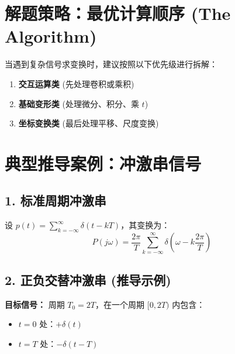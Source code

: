 \section*{ 解题策略：最优计算顺序 (The Algorithm)}
\begin{tcolorbox}[colback=green!5!white, colframe=green!50!black]
当遇到复杂信号求变换时，建议按照以下优先级进行拆解：
\begin{enumerate}
    \item \textbf{交互运算类} (先处理卷积或乘积)
    \item \textbf{基础变形类} (处理微分、积分、乘 $t$)
    \item \textbf{坐标变换类} (最后处理平移、尺度变换)
\end{enumerate}
\end{tcolorbox}

\section{典型推导案例：冲激串信号}

\subsection{1. 标准周期冲激串}
设 $p(t) = \sum_{k=-\infty}^{\infty} \delta(t - kT)$，其变换为：
\[ P(j\omega) = \frac{2\pi}{T} \sum_{k=-\infty}^{\infty} \delta\left(\omega - k\frac{2\pi}{T}\right) \]

\subsection{2. 正负交替冲激串 (推导示例)}
\textbf{目标信号：} 周期 $T_0 = 2T$，在一个周期 $[0, 2T)$ 内包含：
\begin{itemize}
    \item $t=0$ 处：$+\delta(t)$
    \item $t=T$ 处：$-\delta(t-T)$
\end{itemize}

